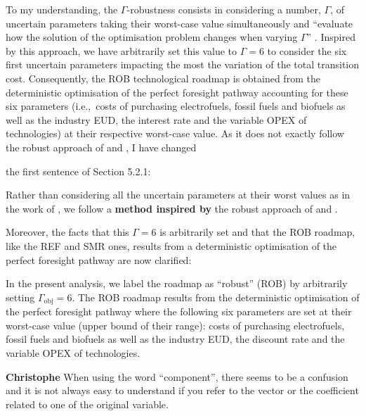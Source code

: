 \documentclass[12pt,a4paper]{article}
\def\ie{i.e.,\ }
\begin{document}
\noindent To my understanding, the $\Gamma$-robustness consists in considering a number, $\Gamma$, of uncertain parameters taking their worst-case value simultaneously and ``evaluate how the solution of the optimisation problem changes when varying $\Gamma$'' \cite{moret2020overcapacity}. Inspired by this approach, we have arbitrarily set this value to $\Gamma=6$ to consider the six first uncertain parameters impacting the most the variation of the total transition cost. Consequently, the ROB technological roadmap is obtained from the deterministic optimisation of the perfect foresight pathway accounting for these six parameters (\ie costs of purchasing electrofuels, fossil fuels and biofuels as well as the industry EUD, the interest rate and the variable OPEX of technologies) at their respective worst-case value. As it does not exactly follow the robust approach of \citet{bertsimas2004price} and \citet{Moret2017PhDThesis}, I have changed {\color{blue}the first sentence of Section 5.2.1:

\begin{mdframed}[style=manuscript] %
Rather than considering all the uncertain parameters at their worst values as in the work of \citet{soyster1973convex}, we follow a \textbf{method inspired by} the robust approach of \citet{bertsimas2004price} and \citet{Moret2017PhDThesis}.
\end{mdframed}

Moreover, the facts that this $\Gamma=6$ is arbitrarily set and that the ROB roadmap, like the REF and SMR ones, results from a deterministic optimisation of the perfect foresight pathway are now clarified:

\begin{mdframed}[style=manuscript] %
In the present analysis, we label the roadmap as ``robust'' (ROB) by arbitrarily setting $\Gamma_{\text{obj}}= 6$. The ROB roadmap results from the deterministic optimisation of the perfect foresight pathway where the following six parameters are set at their worst-case value (upper bound of their range): costs of purchasing electrofuels, fossil fuels and biofuels as well as the industry EUD, the discount rate and the variable OPEX of technologies. 
\end{mdframed}

\begin{mdframed}[style=comment] %
{\color{violet} \textbf{Christophe}} When using the word ``component'', there seems to be a confusion and it is not always easy to understand if you refer to the vector or the coefficient related to one of the original variable.
\end{mdframed}

}
\end{document}
